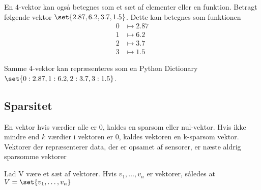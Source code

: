 En 4-vektor kan også betegnes som et sæt af elementer eller en funktion. Betragt følgende vektor $\set{2.87,6.2,3.7,1.5}$. Dette kan betegnes som funktionen
\begin{align}
	\label{eqn:vec_func}
	0&\mapsto 2.87\\
	1&\mapsto 6.2\\
	2&\mapsto 3.7\\
	3&\mapsto 1.5
\end{align}

Samme 4-vektor kan repræsenteres som en Python Dictionary $\set{0:2.87, 1:6.2, 2:3.7, 3:1.5}$.

\subsection{Sparsitet}
En vektor hvis værdier alle er 0, kaldes en sparsom eller nul-vektor. Hvis ikke mindre end $k$ værdier i vektoren er 0, kaldes vektoren en k-sparsom vektor. Vektorer der repræsenterer data, der er opsamet af sensorer, er næste aldrig sparsomme vektorer

\begin{frdef}
	Lad V være et sæt af vektorer. Hvis $v_1,\dots,v_n$ er vektorer, således at $V=\set{v_1,\dots,v_n}$
\end{frdef}